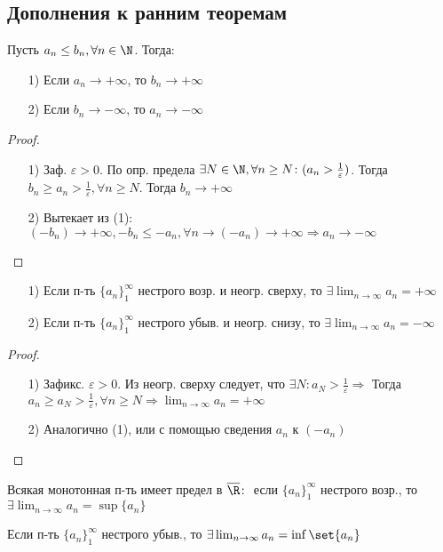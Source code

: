 \subsection{Дополнения к ранним теоремам}
\begin{theorem}[4']
Пусть $a_n \leq b_n, \forall n \in \N$. Тогда:
\begin{itemize}
  \item [1) ] Если $a_n \to +\infty$, то $b_n \to +\infty$
  \item [2) ] Если $b_n \to -\infty$, то $a_n \to -\infty$
\end{itemize}
\end{theorem}
\begin{proof}
\begin{itemize}
  \item[1) ] Заф. $\varepsilon > 0$. По опр. предела $\exists N \in \N, \forall n \geq N \colon (a_n > \frac{1}{\varepsilon})$. Тогда $b_n \geq a_n > \frac{1}{\varepsilon}, \forall n \geq N$. Тогда $b_n \to +\infty$
  \item [2)] Вытекает из (1): $(-b_n) \to +\infty, -b_n \leq -a_n, \forall n \rightarrow (-a_n) \to +\infty \Rightarrow a_n \to -\infty$
\end{itemize}
\end{proof}
\begin{theorem}[6']
\begin{itemize}
  \item[1) ] Если п-ть $\{a_n\}_{1}^{\infty}$ нестрого возр. и неогр. сверху, то $\exists\lim_{n\to\infty}a_n = +\infty$
  \item [2) ] Если п-ть $\{a_n\}_{1}^{\infty}$ нестрого убыв. и неогр. снизу, то $\exists\lim_{n\to\infty} a_n = -\infty$
\end{itemize}
\end{theorem}
\begin{proof}
\begin{itemize}
  \item[1)] Зафикс. $\varepsilon > 0$. Из неогр. сверху следует, что $\exists N \colon a_N > \frac{1}{\varepsilon} \Rightarrow $ Тогда $a_n \geq a_N > \frac{1}{\varepsilon}, \forall n \geq N \Rightarrow \lim_{n\to\infty} a_n = +\infty$
  \item [2) ] Аналогично (1), или с помощью сведения $a_n$ к $(-a_n)$
\end{itemize}
\end{proof}
\begin{consequence}
Всякая монотонная п-ть имеет предел в $\overline{\R}\colon$ если $\{a_n\}_{1}^{\infty}$ нестрого возр., то $\exists \lim_{n\to\infty}a_n = \sup\{a_n\}$

Если п-ть $\{a_n\}_{1}^{\infty}$ нестрого убыв., то $\exists \lim_{n\to\infty} a_n = \inf \set{a_n}$
\end{consequence}
